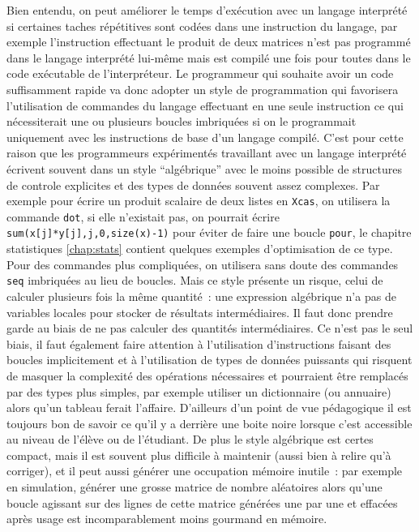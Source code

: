 \documentclass[12pt,a4paper]{book}
\begin{document}
\begin{giacjshere}
Bien entendu, on peut am\'eliorer le temps d'ex\'ecution
avec un langage interpr\'et\'e si certaines taches r\'ep\'etitives
sont cod\'ees dans une instruction du langage, par exemple
l'instruction effectuant le produit de deux matrices n'est pas 
programm\'e dans le langage interpr\'et\'e lui-m\^eme mais est compil\'e
une fois pour toutes dans le code ex\'ecutable de l'interpr\'eteur. 
Le programmeur qui souhaite avoir un code suffisamment rapide va
donc adopter un style de programmation qui favorisera l'utilisation
de commandes du langage effectuant en une seule instruction ce
qui n\'ecessiterait une ou plusieurs boucles imbriqu\'ees
si on le programmait uniquement avec les
instructions de base d'un langage compil\'e. 
C'est pour cette raison
que les programmeurs exp\'eriment\'es travaillant avec un 
langage interpr\'et\'e \'ecrivent souvent dans un style
``alg\'ebrique'' avec le moins possible de structures de controle explicites
et des types de donn\'ees souvent assez complexes.
Par exemple pour \'ecrire un produit scalaire de deux listes en {\tt Xcas},
on utilisera la commande \verb|dot|, si elle n'existait pas, on
pourrait \'ecrire \verb|sum(x[j]*y[j],j,0,size(x)-1)| pour \'eviter
de faire une boucle \verb|pour|, le chapitre statistiques \ref{chap:stats} 
contient quelques exemples d'optimisation de ce type. 
Pour des commandes plus compliqu\'ees,
on utilisera sans doute des commandes \verb|seq| imbriqu\'ees au lieu
de boucles.
Mais ce style pr\'esente un risque, celui de calculer
plusieurs fois la m\^eme quantit\'e~: une expression alg\'ebrique
n'a pas de variables locales pour stocker de r\'esultats 
interm\'ediaires. 
Il faut donc prendre garde au biais de ne
pas calculer des quantit\'es interm\'ediaires.
Ce n'est pas le seul biais, 
il faut \'egalement faire attention à l'utilisation
d'instructions faisant des boucles implicitement et
à l'utilisation de types de donn\'ees puissants qui risquent de masquer
la complexit\'e des op\'erations n\'ecessaires et pourraient \^etre
remplac\'es par des types plus simples, par exemple
utiliser un dictionnaire (ou annuaire) 
alors qu'un tableau ferait l'affaire. 
D'ailleurs d'un point de vue
p\'edagogique il est toujours bon de savoir ce qu'il y a derri\`ere une boite
noire lorsque c'est accessible au niveau de l'\'el\`eve ou de l'\'etudiant. 
De plus le style alg\'ebrique
est certes compact, mais il est souvent plus difficile à maintenir 
(aussi bien à relire qu'à corriger), 
et il peut aussi g\'en\'erer une occupation m\'emoire inutile~: par
exemple en simulation, g\'en\'erer une grosse matrice de nombre al\'eatoires
alors qu'une boucle agissant sur des lignes de cette matrice g\'en\'er\'ees
une par une et effac\'ees apr\`es usage est incomparablement
moins gourmand en m\'emoire.


\end{giacjshere}
\end{document}
